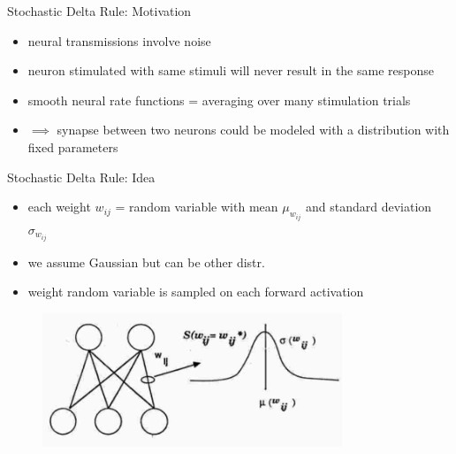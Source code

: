 \documentclass{beamer}
\begin{document}
\begin{frame}{Stochastic Delta Rule: Motivation}

\begin{itemize}
\item neural transmissions involve noise
\item neuron stimulated with same stimuli will never result in the same response
\item smooth neural rate
functions = averaging over many stimulation trials
\item $\implies$ synapse between two neurons could be modeled with a distribution with fixed parameters
\end{itemize}

\end{frame}
\begin{frame}{Stochastic Delta Rule: Idea}

\begin{itemize}
\item each weight $w_{ij}$ = random variable with mean $\mu_{w_{ij}}$ and standard
deviation $\sigma_{w_{ij}}$
\item we assume Gaussian but can be other distr.
\item weight random variable is
sampled on each forward activation

\end{itemize}


\begin{figure}[h]
\includegraphics[width=0.8\textwidth]{img/sampling}
\end{figure}

\end{frame}
\end{document}
